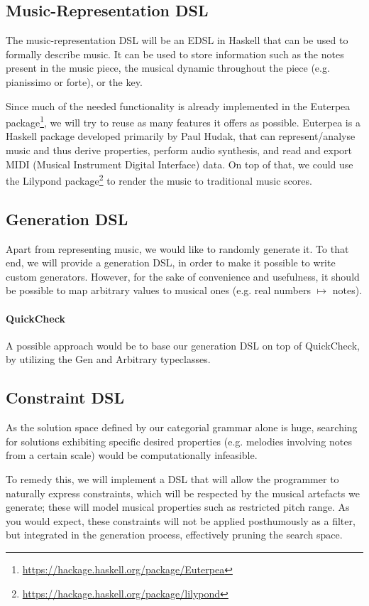 \documentclass[10pt,a4paper]{article}
\newcommand{\site}[1]{\footnote{\url{#1}}}
\begin{document}
\subsection{Music-Representation DSL}
The music-representation DSL will be an EDSL in Haskell that can be used to formally describe music. It can be used to store information such as the notes present in the music piece, the musical dynamic throughout the piece (e.g. pianissimo or forte), or the key.

Since much of the needed functionality is already implemented in the Euterpea package\site{https://hackage.haskell.org/package/Euterpea}, we will try to reuse as many features it offers as possible. Euterpea is a Haskell package developed primarily by Paul Hudak, that can represent/analyse music and thus derive properties, perform audio synthesis, and read and export MIDI (Musical Instrument Digital Interface) data. On top of that, we could use the Lilypond package\site{https://hackage.haskell.org/package/lilypond} to render the music to traditional music scores.

\subsection{Generation DSL}
Apart from representing music, we would like to randomly generate it. To that end, we will provide a generation DSL, in order to make it possible to write custom generators. However, for the sake of convenience and usefulness, it should be possible to map arbitrary values to musical ones (e.g. real numbers $\mapsto$ notes).
\paragraph{QuickCheck}
A possible approach would be to base our generation DSL on top of QuickCheck, by utilizing the Gen and Arbitrary typeclasses.

\subsection{Constraint DSL}
As the solution space defined by our categorial grammar alone is huge, searching for solutions exhibiting specific desired properties (e.g. melodies involving notes from a certain scale) would be computationally infeasible.

To remedy this, we will implement a DSL that will allow the programmer to naturally express constraints, which will be respected by the musical artefacts we generate; these will model musical properties such as restricted pitch range. As you would expect, these constraints will not be applied posthumously as a filter, but integrated in the generation process, effectively pruning the search space.
\end{document}
